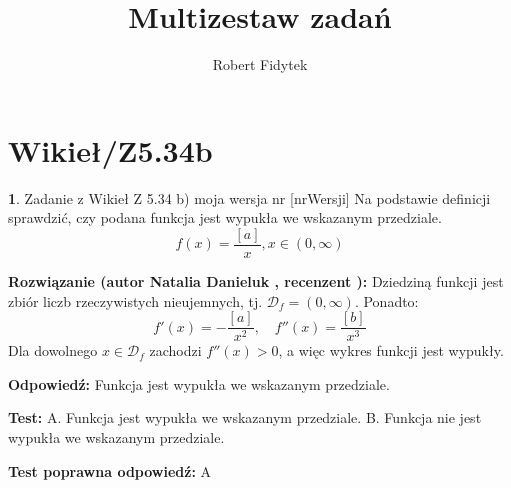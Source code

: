 \documentclass[12pt, a4paper]{article}
\title{Multizestaw zadań}
\author{Robert Fidytek}
\date{}
\theoremstyle{definition} %
\newtheorem{zad}{}
\newcommand{\kategoria}[1]{\section{#1}} %
\newcommand{\zadStart}[1]{\begin{zad}#1\newline} %
\newcommand{\zadStop}{\end{zad}}   %
\newcommand{\rozwStart}[2]{\noindent \textbf{Rozwiązanie (autor #1 , recenzent #2): }\newline} %
\newcommand{\rozwStop}{\newline}                                            %
\newcommand{\odpStart}{\noindent \textbf{Odpowiedź:}\newline}    %
\newcommand{\odpStop}{\newline}                                             %
\newcommand{\testStart}{\noindent \textbf{Test:}\newline} %
\newcommand{\testStop}{\newline} %
\newcommand{\kluczStart}{\noindent \textbf{Test poprawna odpowiedź:}\newline} %
\newcommand{\kluczStop}{\newline} %
\begin{document}
\maketitle

\kategoria{Wikieł/Z5.34b}

\zadStart{Zadanie z Wikieł Z 5.34 b) moja wersja nr [nrWersji]}
Na podstawie definicji sprawdzić, czy podana funkcja jest wypukła we wskazanym przedziale.
$$f(x) = \frac{[a]}{x}, x \in (0,\infty)$$
\zadStop

\rozwStart{Natalia Danieluk}{}
Dziedziną funkcji jest zbiór liczb rzeczywistych nieujemnych, tj. $\mathcal{D}_f=(0,\infty)$. Ponadto:
$$f'(x) = -\frac{[a]}{x^2},\quad f''(x) = \frac{[b]}{x^3}$$
Dla dowolnego $x \in \mathcal{D}_f$ zachodzi $f''(x) > 0$, a więc wykres funkcji jest wypukły.
\rozwStop

\odpStart
Funkcja jest wypukła we wskazanym przedziale.
\odpStop

\testStart
A. Funkcja jest wypukła we wskazanym przedziale.
B. Funkcja nie jest wypukła we wskazanym przedziale.
\testStop

\kluczStart
A
\kluczStop
\end{document}
